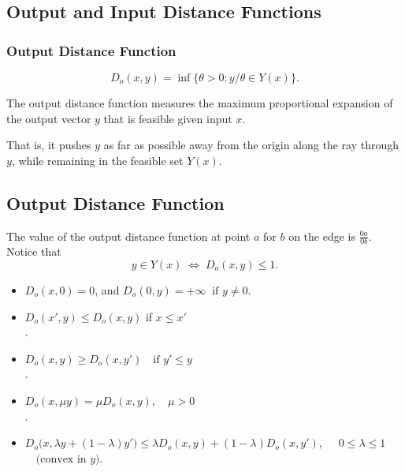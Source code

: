 \subsection{Output and Input Distance Functions}

\subsubsection{Output Distance Function}

\[
D_o(x,y)
=
\inf \{\theta > 0 : y/\theta \in Y(x)\}.
\]

\medskip

The output distance function measures the maximum proportional expansion
of the output vector $y$ that is feasible given input $x$.

That is, it pushes $y$ as far as possible away from the origin along
the ray through $y$, while remaining in the feasible set $Y(x)$.


\subsection*{Output Distance Function}

The value of the output distance function at point $a$ for $b$ on the edge is $\frac{0a}{0b}$.
Notice that
\[
y \in Y(x) \;\Longleftrightarrow\; D_o(x,y) \le 1.
\]


\begin{itemize}
    \item[$D_o$.1] $D_o(x,0)=0$, and $D_o(0,y)=+\infty \;\; \text{if } y \ne 0.$

    \item[$D_o$.2] $D_o(x',y) \le D_o(x,y)$ if $x \le x'$\\
    .
    
    \item[$D_o$.3] $D_o(x,y) \ge D_o(x,y') \quad \text{if } y' \le y $\\
    .
    
    \item[$D_o$.4] $D_o(x,\mu y) = \mu D_o(x,y), \quad \mu > 0$\\
    .
    
    \item[$D_o$.5] $D_o\bigl(x, \lambda y + (1-\lambda)y'\bigr) \le \lambda D_o(x,y) + (1-\lambda) D_o(x,y'),$
    $\quad 0 \le \lambda \le 1$
    $\quad \text{(convex in $y$)}.$
\end{itemize}

